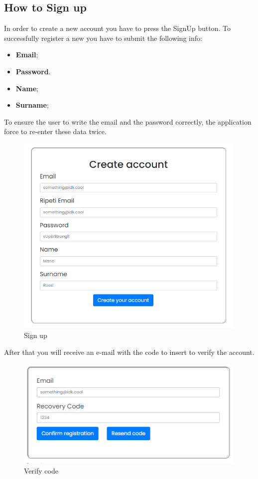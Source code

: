 \subsection{How to Sign up} \label{_signup}
In order to create a new account you have to press the SignUp button. To successfully register a new you have to submit the following info:
\begin{itemize} 
    \item \textbf{Email};
    \item \textbf{Password}. 
    \item \textbf{Name};
    \item \textbf{Surname};
\end{itemize}
To ensure the user to write the email and the password correctly, the application force to re-enter these data twice.

\begin{figure}[H]
    \centering
    \includegraphics[width=30em]{res/images/cliente/signup.png}
    \caption{Sign up}
\end{figure}

After that you will receive an e-mail with the code to insert to verify the account.

\begin{figure}[H]
    \centering
    \includegraphics[width=30em]{res/images/cliente/verify.png}
    \caption{Verify code}
\end{figure}


